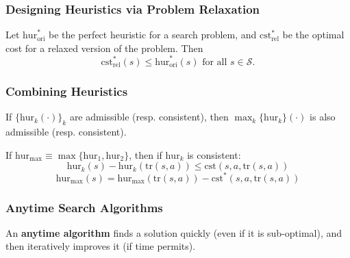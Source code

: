 \subsubsection{Designing Heuristics via Problem Relaxation}
\begin{definition}
    Let $\text{hur}^*_{\text{ori}}$ be the perfect heuristic for a search problem, and $\text{cst}^*_{\text{rel}}$ be the optimal cost for a relaxed version of the problem. Then
    \[
    \text{cst}^*_{\text{rel}}(s) \leq \text{hur}^*_{\text{ori}}(s) \text{ for all } s \in \mathcal{S}.
    \]
\end{definition}

\subsubsection{Combining Heuristics}
\begin{definition}
    If $\{ \text{hur}_k(\cdot) \}_k$ are admissible (resp. consistent), then $\max_k \{\text{hur}_k\} (\cdot)$ is also admissible (resp. consistent).
\end{definition}

\begin{definition}
    If $\text{hur}_{\max} \equiv \max \{\text{hur}_1, \text{hur}_2\}$, then if $\text{hur}_k$ is consistent:
    \[
    \text{hur}_k(s) - \text{hur}_k(\text{tr}(s,a)) \leq \text{cst}(s,a,\text{tr}(s,a))
    \]
    \[
    \text{hur}_{\max} (s)= \text{hur}_{\max}(\text{tr}(s,a)) - \text{cst}^*(s,a,\text{tr}(s,a))
    \]
\end{definition}

\subsubsection{Anytime Search Algorithms}
\begin{definition}
    An \textbf{anytime algorithm} finds a solution quickly (even if it is sub-optimal), and then iteratively improves it (if time permits).
\end{definition}
\newpage

